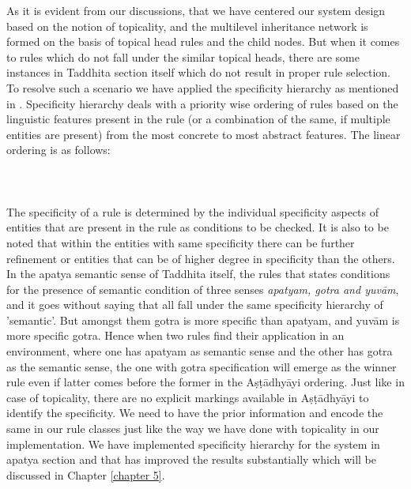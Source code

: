 \documentclass[a4paper,11pt,twoside,openright]{report}
\begin{document}
As it is evident from our discussions, that we have centered our system design based on the notion of topicality, and the multilevel inheritance network is formed on the basis of topical head rules and the child nodes. But when it comes to rules which do not fall under the similar topical heads, there are some instances in Taddhita section itself which do not result in proper rule selection. To resolve such a scenario we have applied the specificity hierarchy as mentioned in . Specificity hierarchy deals with a priority wise ordering of rules based on the linguistic features present in the rule (or a combination of the same, if multiple entities are present) from the most concrete to most abstract features. The linear ordering is as follows:
\\ \\
\noindent{}
\\ \\
The specificity of a rule is determined by the individual specificity aspects of entities that are present in the rule as conditions to be checked. It is also to be noted that within the entities with same specificity there can be further refinement or entities that can be of higher degree in specificity than the others. In the apatya semantic sense of Taddhita itself, the rules that states conditions for the presence of semantic condition of three senses \textsl{apatyam, gotra and yuvām}, and it goes without saying that all fall under the same specificity hierarchy of 'semantic'. But amongst them gotra is more specific than apatyam, and yuvām is more specific gotra. Hence when two rules find their application in an environment, where one has apatyam as semantic sense and the other has gotra as the semantic sense, the one with gotra specification will emerge as the winner rule even if latter comes before the former in the Aṣṭādhyāyi ordering. Just like in case of topicality, there are no explicit markings available in Aṣṭādhyāyi to identify the specificity. We need to have the prior information and encode the same in our rule classes just like the way we have done with topicality in our implementation. We have implemented specificity hierarchy for the system in apatya section and that has improved the results substantially which will be discussed in Chapter \ref{chapter 5}. 
\end{document}

